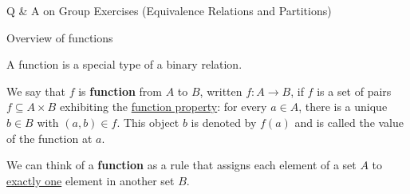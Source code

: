 \documentclass[10pt]{beamer}
\begin{document}
\begin{frame}
\begin{minipage}{0.35\textwidth}
\end{minipage}
\end{frame}


\begin{frame}[standout]
Q  \& A on Group Exercises  (Equivalence Relations and Partitions)
\end{frame}


\begin{frame}[standout]
Overview of functions
\end{frame}


\begin{frame}


\begin{myyellowbox}[title=Remark]
A function is a special type of a binary relation.
\end{myyellowbox}

\vfill 
\begin{mygreenbox}[title=Definition (Hampkins pp. 128)]
We say that $f$ is \textbf{function} from $A$ to $B$, written $f : A \to B$, if $f$ is a set of pairs $ f \subseteq  A \times B$ exhibiting the \underline{function property}: for every $a \in A$, there is a unique $b \in B$ with $(a, b) \in f$. This object $b$ is denoted by $f(a)$ and is called the value of the function at $a$.
\end{mygreenbox}
\vfill 
\begin{myredbox}[title=Characterization]
We can think of a \textbf{function} as a rule that assigns each element of a set $A$ to \underline{exactly one} element in another set $B$.
\end{myredbox}

\end{frame}
\end{document}

